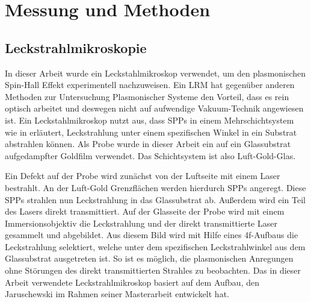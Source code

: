 \documentclass[titlepage]{article}
\begin{document}
 	
\section{Messung und Methoden}
\subsection{Leckstrahlmikroskopie}
	In dieser Arbeit wurde ein Leckstahlmikroskop verwendet, um den plasmonischen Spin-Hall Effekt experimentell nachzuweisen. Ein LRM hat gegenüber anderen Methoden zur Untersuchung Plasmonischer Systeme den Vorteil, dass es rein optisch arbeitet und deswegen nicht auf aufwendige Vakuum-Technik angewiesen ist. Ein Leckstahlmikroskop nutzt aus, dass SPPs in einem Mehrschichtsystem wie in  erläutert, Leckstrahlung unter einem spezifischen Winkel in ein Substrat abstrahlen können. Als Probe wurde in dieser Arbeit ein auf ein Glassubstrat aufgedampfter Goldfilm verwendet. Das Schichtsystem ist also Luft-Gold-Glas.
	
	Ein Defekt auf der Probe wird zunächst von der Luftseite mit einem Laser bestrahlt. An der Luft-Gold Grenzflächen werden hierdurch SPPs angeregt. Diese SPPs strahlen nun Leckstrahlung in das Glassubstrat ab.
	Außerdem wird ein Teil des Lasers direkt transmittiert. Auf der Glasseite der Probe wird mit einem Immersionsobjektiv die Leckstrahlung und der direkt transmittierte Laser gesammelt und abgebildet.	
	 Aus diesem Bild wird mit Hilfe eines 4f-Aufbaus die Leckstrahlung selektiert, welche unter dem spezifischen Leckstrahlwinkel aus dem Glassubstrat ausgetreten ist. So ist es möglich, die plasmonischen Anregungen ohne Störungen des direkt transmittierten Strahles zu beobachten. Das in dieser Arbeit verwendete Leckstrahlmikroskop basiert auf dem Aufbau, den Jaruschewski im Rahmen seiner Masterarbeit \cite{Jaruschewski.2020} entwickelt hat.
\end{document}
